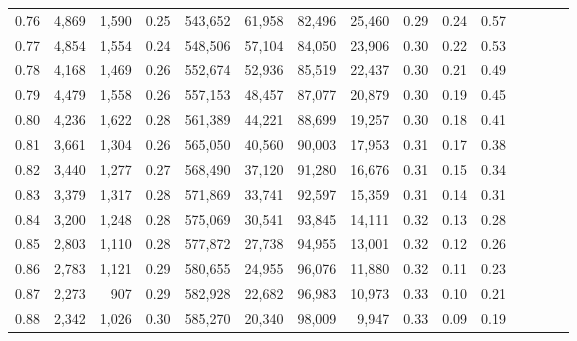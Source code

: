 \begin{tabular}{rrrcrrrrrrrrrrr}
0.76 &   4,869 &  1,590 &                                       0.25 &  543,652 &   61,958 &   82,496 &   25,460 &  0.29 &  0.24 &                         0.57 \\
0.77 &   4,854 &  1,554 &                                       0.24 &  548,506 &   57,104 &   84,050 &   23,906 &  0.30 &  0.22 &                         0.53 \\
0.78 &   4,168 &  1,469 &                                       0.26 &  552,674 &   52,936 &   85,519 &   22,437 &  0.30 &  0.21 &                         0.49 \\
0.79 &   4,479 &  1,558 &                                       0.26 &  557,153 &   48,457 &   87,077 &   20,879 &  0.30 &  0.19 &                         0.45 \\
0.80 &   4,236 &  1,622 &                                       0.28 &  561,389 &   44,221 &   88,699 &   19,257 &  0.30 &  0.18 &                         0.41 \\
0.81 &   3,661 &  1,304 &                                       0.26 &  565,050 &   40,560 &   90,003 &   17,953 &  0.31 &  0.17 &                         0.38 \\
0.82 &   3,440 &  1,277 &                                       0.27 &  568,490 &   37,120 &   91,280 &   16,676 &  0.31 &  0.15 &                         0.34 \\
0.83 &   3,379 &  1,317 &                                       0.28 &  571,869 &   33,741 &   92,597 &   15,359 &  0.31 &  0.14 &                         0.31 \\
0.84 &   3,200 &  1,248 &                                       0.28 &  575,069 &   30,541 &   93,845 &   14,111 &  0.32 &  0.13 &                         0.28 \\
0.85 &   2,803 &  1,110 &                                       0.28 &  577,872 &   27,738 &   94,955 &   13,001 &  0.32 &  0.12 &                         0.26 \\
0.86 &   2,783 &  1,121 &                                       0.29 &  580,655 &   24,955 &   96,076 &   11,880 &  0.32 &  0.11 &                         0.23 \\
0.87 &   2,273 &    907 &                                       0.29 &  582,928 &   22,682 &   96,983 &   10,973 &  0.33 &  0.10 &                         0.21 \\
0.88 &   2,342 &  1,026 &                                       0.30 &  585,270 &   20,340 &   98,009 &    9,947 &  0.33 &  0.09 &                         0.19 \\

\end{tabular}
